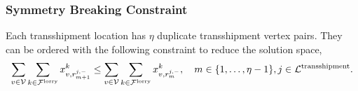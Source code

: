 \subsubsection{Symmetry Breaking Constraint}
\label{sec:symmetry}

Each transshipment location has $\eta$ duplicate transshipment vertex pairs. They can be ordered with the following constraint to reduce the solution space,
\begin{align}
  \sum_{v \in \mathcal V} 
  \sum_{k \in \mathcal F^{\rm lorry}}
  x^k_{v,r^{j,-}_{m+1}} 
  \leq 
  \sum_{v \in \mathcal V} 
  \sum_{k \in \mathcal F^{\rm lorry}}
  x^k_{v,r^{j,-}_{m}} ,
  \quad m \in \{ 1,\ldots, \eta -1 \},  j \in \mathcal L^{\rm transshipment}.
\end{align}


